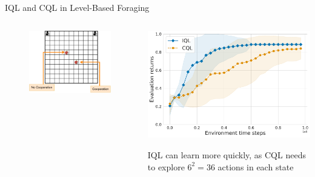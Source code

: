 \begin{frame}{IQL and CQL in Level-Based Foraging}

\begin{columns}
    \begin{column}{0.5\textwidth}
    \begin{figure}
        \centering
        \includegraphics[width=\textwidth,height=.8\textheight,keepaspectratio]{images/environments/lbf/tabular_marl_lbf_annot.pdf}
        \label{fig:enter-label}
        
    \end{figure}
        
    \end{column}
    
    \begin{column}{0.5\textwidth}
    \vspace{10pt}
        \centering
        \includegraphics[width=\textwidth,height=.8\textheight,keepaspectratio]{images/chapter_5/tabular_marl_lbf_returns_iql_cql.pdf}
        \label{fig:enter-label}
        \blist
            \item IQL can learn more quickly, as CQL needs to explore $6^2 = 36$ actions in each state
        \elist
        
    \end{column}
\end{columns}
    
\end{frame}

